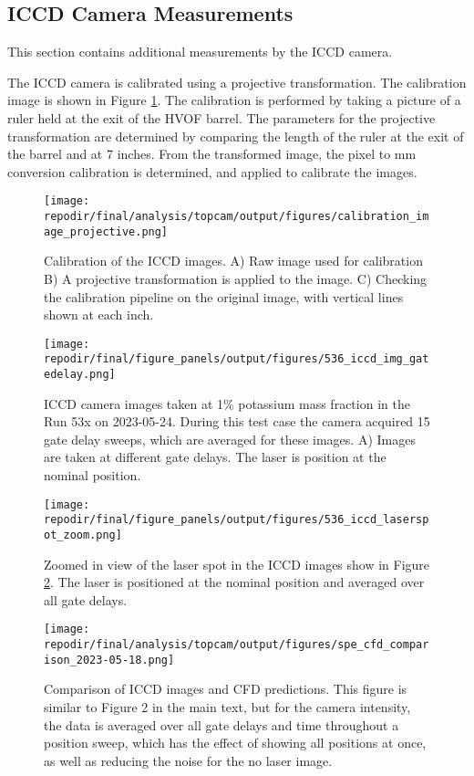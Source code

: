 \clearpage
\subsection{ICCD Camera Measurements}

This section contains additional measurements by the ICCD camera. 

The ICCD camera is calibrated using a projective transformation. The calibration image is shown in Figure \ref{fig:SI_iccd_calibration}. The calibration is performed by taking a picture of a ruler held at the exit of the HVOF barrel. The parameters for the projective transformation are determined by comparing the length of the ruler at the exit of the barrel and at 7 inches. From the transformed image, the pixel to mm conversion calibration is determined, and applied to calibrate the images. 

\begin{figure}[]
\centering
\texttt{[image: \\repodir/final/analysis/topcam/output/figures/calibration\_image\_projective.png]}
\caption{Calibration of the ICCD images. A) Raw image used for calibration B) A projective transformation is applied to the image. C) Checking the calibration pipeline on the original image, with vertical lines shown at each inch.}
\label{fig:SI_iccd_calibration}
\end{figure}

\begin{figure}
    \centering
    \texttt{[image: \\repodir/final/figure\_panels/output/figures/536\_iccd\_img\_gatedelay.png]} 
    \caption{ICCD camera images taken at 1\% potassium mass fraction in the Run 53x on 2023-05-24. During this test case the camera acquired 15 gate delay sweeps, which are averaged for these images. A) Images are taken at different gate delays. The laser is position at the nominal position. }
    \label{fig:SI_536_iccd}
\end{figure}


\begin{figure}
    \centering
    \texttt{[image: \\repodir/final/figure\_panels/output/figures/536\_iccd\_laserspot\_zoom.png]} 
    \caption{Zoomed in view of the laser spot in the ICCD images show in Figure \ref{fig:SI_536_iccd}. The laser is positioned at the nominal position and averaged over all gate delays.}
    \label{fig:SI_536_iccd_laserspot_zoom}
\end{figure}


\begin{figure}[]
\centering
\texttt{[image: \\repodir/final/analysis/topcam/output/figures/spe\_cfd\_comparison\_2023-05-18.png]}
\caption{Comparison of ICCD images and CFD predictions. This figure is similar to Figure 2 in the main text, but for the camera intensity, the data is averaged over all gate delays and time throughout a position sweep, which has the effect of showing all positions at once, as well as reducing the noise for the no laser image.}
\label{fig:SI_iccd_cfd_comparison}
\end{figure}


